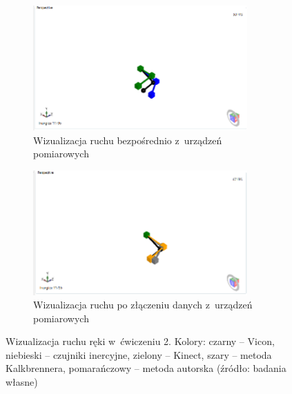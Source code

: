 \begin{figure}[!htb]
	\captionsetup{singlelinecheck=off}
	\centering
	\begin{subfigure}[b]{0.48\textwidth}
		\centering
		\includegraphics[width=0.9\textwidth]{images/200/raw.png}	
		\caption{Wizualizacja ruchu bezpośrednio z~urządzeń pomiarowych}
		\label{fig:experiments:sec:raw}
	\end{subfigure}
	\hfill																																	
	\begin{subfigure}[b]{0.48\textwidth}
		\centering
		\includegraphics[width=0.9\textwidth]{images/200/Fused.png}		
		\caption{Wizualizacja ruchu po złączeniu danych z~urządzeń pomiarowych}
		\label{fig:experiments:sec:fused}
	\end{subfigure}
																																									
	\caption[Wizualizacja ruchu ręki w~ćwiczeniu 2]{Wizualizacja ruchu ręki w~ćwiczeniu 2.  Kolory: czarny -- Vicon, niebieski -- czujniki inercyjne, zielony -- Kinect, szary -- metoda Kalkbrennera, pomarańczowy -- metoda autorska (źródło: badania własne)}	
	\label{fig:experiments:sec}
\end{figure}


